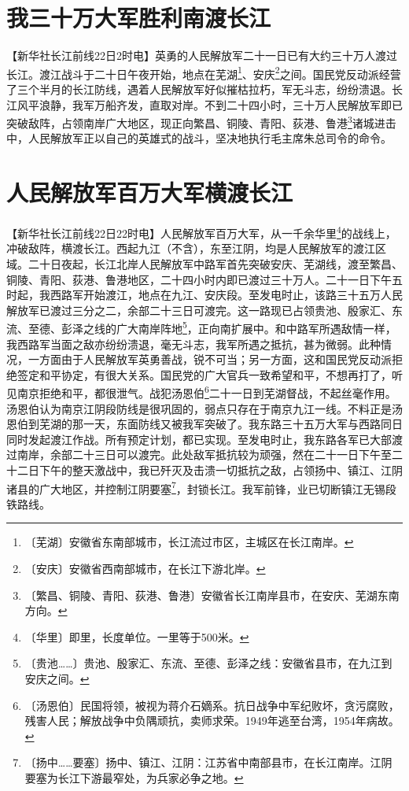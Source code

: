\documentclass[12pt,UTF-8,openany]{ctexbook}
\begin{document}
\begin{normalsize}
    
    \section{我三十万大军胜利南渡长江}
    
    【新华社长江前线22日2时电】英勇的人民解放军二十一日已有大约三十万人渡过长江。渡江战斗于二十日午夜开始，地点在芜湖\footnote{〔芜湖〕安徽省东南部城市，长江流过市区，主城区在长江南岸。}、安庆\footnote{〔安庆〕安徽省西南部城市，在长江下游北岸。}之间。国民党反动派经营了三个半月的长江防线，遇着人民解放军好似摧枯拉朽，军无斗志，纷纷溃退。长江风平浪静，我军万船齐发，直取对岸。不到二十四小时，三十万人民解放军即已突破敌阵，占领南岸广大地区，现正向繁昌、铜陵、青阳、荻港、鲁港\footnote{〔繁昌、铜陵、青阳、荻港、鲁港〕安徽省长江南岸县市，在安庆、芜湖东南方向。}诸城进击中，人民解放军正以自己的英雄式的战斗，坚决地执行毛主席朱总司令的命令。
    
    \section{人民解放军百万大军横渡长江}
    
    【新华社长江前线22日22时电】人民解放军百万大军，从一千余华里\footnote{〔华里〕即里，长度单位。一里等于500米。}的战线上，冲破敌阵，横渡长江。西起九江（不含），东至江阴，均是人民解放军的渡江区域。二十日夜起，长江北岸人民解放军中路军首先突破安庆、芜湖线，渡至繁昌、铜陵、青阳、荻港、鲁港地区，二十四小时内即已渡过三十万人。二十一日下午五时起，我西路军开始渡江，地点在九江、安庆段。至发电时止，该路三十五万人民解放军已渡过三分之二，余部二十三日可渡完。这一路现已占领贵池、殷家汇、东流、至德、彭泽之线的广大南岸阵地\footnote{〔贵池……〕贵池、殷家汇、东流、至德、彭泽之线：安徽省县市，在九江到安庆之间。}，正向南扩展中。和中路军所遇敌情一样，我西路军当面之敌亦纷纷溃退，毫无斗志，我军所遇之抵抗，甚为微弱。此种情况，一方面由于人民解放军英勇善战，锐不可当；另一方面，这和国民党反动派拒绝签定和平协定，有很大关系。国民党的广大官兵一致希望和平，不想再打了，听见南京拒绝和平，都很泄气。战犯汤恩伯\footnote{〔汤恩伯〕民国将领，被视为蒋介石嫡系。抗日战争中军纪败坏，贪污腐败，残害人民；解放战争中负隅顽抗，卖师求荣。1949年逃至台湾，1954年病故。}二十一日到芜湖督战，不起丝毫作用。汤恩伯认为南京江阴段防线是很巩固的，弱点只存在于南京九江一线。不料正是汤恩伯到芜湖的那一天，东面防线又被我军突破了。我东路三十五万大军与西路同日同时发起渡江作战。所有预定计划，都已实现。至发电时止，我东路各军已大部渡过南岸，余部二十三日可以渡完。此处敌军抵抗较为顽强，然在二十一日下午至二十二日下午的整天激战中，我已歼灭及击溃一切抵抗之敌，占领扬中、镇江、江阴诸县的广大地区，并控制江阴要塞\footnote{〔扬中……要塞〕扬中、镇江、江阴：江苏省中南部县市，在长江南岸。江阴要塞为长江下游最窄处，为兵家必争之地。}，封锁长江。我军前锋，业已切断镇江无锡段铁路线。
    
\end{normalsize}
\end{document}

